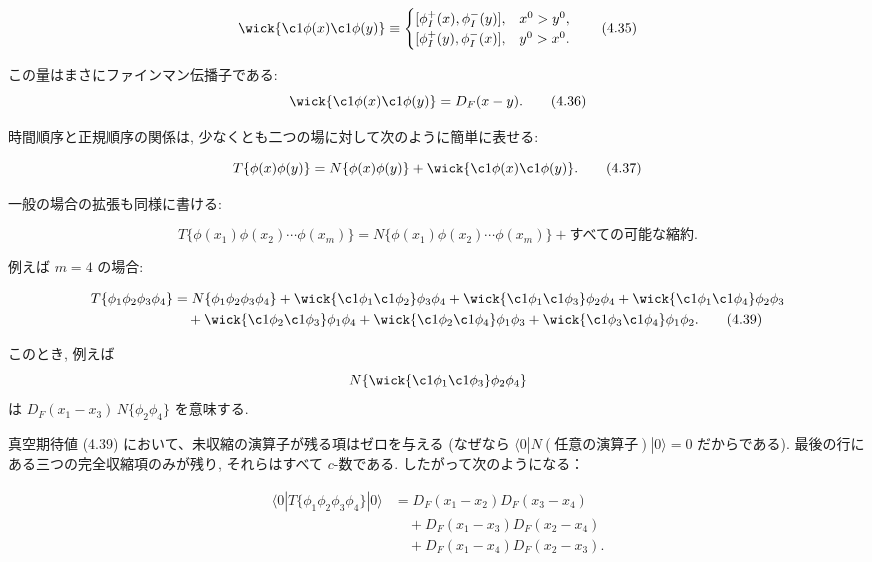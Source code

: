 \documentclass[a4paper,12pt]{article}
\begin{document}
\begin{equation*}
\wick{\c1\phi(x)\c1\phi(y)} \equiv
\begin{cases}
[\phi_I^+(x),\phi_I^-(y)], & x^0 > y^0 , \\
[\phi_I^+(y),\phi_I^-(x)], & y^0 > x^0 .
\end{cases}
\tag{4.35}
\end{equation*}

この量はまさにファインマン伝播子である:
\begin{equation*}
\wick{\c1\phi(x)\c1\phi(y)} = D_F(x-y).
\tag{4.36}
\end{equation*}

時間順序と正規順序の関係は, 少なくとも二つの場に対して次のように簡単に表せる:

\begin{equation*}
T\{\phi(x)\phi(y)\} 
= N\{\phi(x)\phi(y)\} 
+ \wick{\c1\phi(x)\c1\phi(y)} .
\tag{4.37}
\end{equation*}

一般の場合の拡張も同様に書ける:

\begin{equation*}
T\{\phi(x_1)\phi(x_2)\cdots \phi(x_m)\}
= N\{\phi(x_1)\phi(x_2)\cdots \phi(x_m)\} 
+ \text{すべての可能な縮約}.
\tag{4.38}
\end{equation*}

例えば $m=4$ の場合:

\begin{align*}
T\{\phi_1\phi_2\phi_3\phi_4\} 
&= N\{\phi_1\phi_2\phi_3\phi_4\} 
+ \wick{\c1\phi_1\c1\phi_2}\phi_3\phi_4
+ \wick{\c1\phi_1\c1\phi_3}\phi_2\phi_4
+ \wick{\c1\phi_1\c1\phi_4}\phi_2\phi_3 \\
&\quad + \wick{\c1\phi_2\c1\phi_3}\phi_1\phi_4
+ \wick{\c1\phi_2\c1\phi_4}\phi_1\phi_3
+ \wick{\c1\phi_3\c1\phi_4}\phi_1\phi_2 .
\tag{4.39}
\end{align*}

このとき, 例えば
\[
N\{\wick{\c1\phi_1\c1\phi_3}\phi_2\phi_4\}
\]
は $D_F(x_1-x_3)\,N\{\phi_2\phi_4\}$ を意味する.

真空期待値 (4.39) において、未収縮の演算子が残る項はゼロを与える (なぜなら \(\langle 0| N(\text{任意の演算子}) |0 \rangle = 0\) だからである).
最後の行にある三つの完全収縮項のみが残り, それらはすべて \(c\)-数である.
したがって次のようになる：

\begin{align*}
\langle 0|T\{\phi_1 \phi_2 \phi_3 \phi_4\}|0\rangle 
&= D_F(x_1 - x_2)D_F(x_3 - x_4)\\
&\quad+ D_F(x_1 - x_3)D_F(x_2 - x_4)\\
&\quad+ D_F(x_1 - x_4)D_F(x_2 - x_3). \tag{4.40}
\end{align*}
\end{document}
